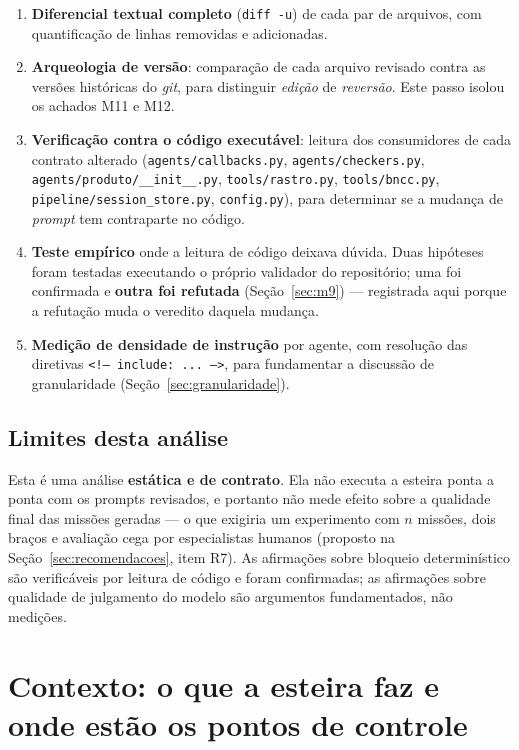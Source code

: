\documentclass[11pt,a4paper]{article}
\newcommand{\cod}[1]{\texttt{\small #1}}
\begin{document}
\begin{enumerate}[leftmargin=*]
  \item \textbf{Diferencial textual completo} (\cod{diff -u}) de cada par de arquivos, com quantificação de
  linhas removidas e adicionadas.
  \item \textbf{Arqueologia de versão}: comparação de cada arquivo revisado contra as versões históricas do
  \textit{git}, para distinguir \textit{edição} de \textit{reversão}. Este passo isolou os achados M11 e M12.
  \item \textbf{Verificação contra o código executável}: leitura dos consumidores de cada contrato alterado
  (\cod{agents/callbacks.py}, \cod{agents/checkers.py}, \cod{agents/produto/\_\_init\_\_.py},
  \cod{tools/rastro.py}, \cod{tools/bncc.py}, \cod{pipeline/session\_store.py}, \cod{config.py}), para
  determinar se a mudança de \textit{prompt} tem contraparte no código.
  \item \textbf{Teste empírico} onde a leitura de código deixava dúvida. Duas hipóteses foram testadas
  executando o próprio validador do repositório; uma foi confirmada e \textbf{outra foi refutada}
  (Seção~\ref{sec:m9}) --- registrada aqui porque a refutação muda o veredito daquela mudança.
  \item \textbf{Medição de densidade de instrução} por agente, com resolução das diretivas
  \cod{<!-- include: ... -->}, para fundamentar a discussão de granularidade (Seção~\ref{sec:granularidade}).
\end{enumerate}

\subsection{Limites desta análise}

Esta é uma análise \textbf{estática e de contrato}. Ela não executa a esteira ponta a ponta com os prompts
revisados, e portanto não mede efeito sobre a qualidade final das missões geradas --- o que exigiria um
experimento com $n$ missões, dois braços e avaliação cega por especialistas humanos (proposto na
Seção~\ref{sec:recomendacoes}, item R7). As afirmações sobre bloqueio determinístico são verificáveis por
leitura de código e foram confirmadas; as afirmações sobre qualidade de julgamento do modelo são
argumentos fundamentados, não medições.

\newpage
\section{Contexto: o que a esteira faz e onde estão os pontos de controle}
\end{document}
